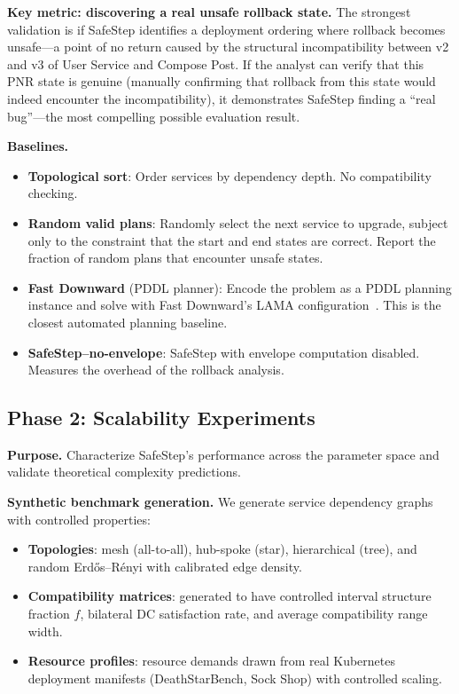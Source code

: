 \documentclass[10pt,twocolumn]{article}
\begin{document}
\textbf{Key metric: discovering a real unsafe rollback state.} The strongest validation is if SafeStep identifies a deployment ordering where rollback becomes unsafe---a point of no return caused by the structural incompatibility between v2 and v3 of User Service and Compose Post. If the analyst can verify that this PNR state is genuine (manually confirming that rollback from this state would indeed encounter the incompatibility), it demonstrates SafeStep finding a ``real bug''---the most compelling possible evaluation result.

\textbf{Baselines.}
\begin{itemize}
\item \textbf{Topological sort}: Order services by dependency depth. No compatibility checking.
\item \textbf{Random valid plans}: Randomly select the next service to upgrade, subject only to the constraint that the start and end states are correct. Report the fraction of random plans that encounter unsafe states.
\item \textbf{Fast Downward} (PDDL planner): Encode the problem as a PDDL planning instance and solve with Fast Downward's LAMA configuration~\cite{richter2010lama}. This is the closest automated planning baseline.
\item \textbf{SafeStep--no-envelope}: SafeStep with envelope computation disabled. Measures the overhead of the rollback analysis.
\end{itemize}

\subsection{Phase 2: Scalability Experiments}
\label{sec:eval-scalability}

\textbf{Purpose.} Characterize SafeStep's performance across the parameter space and validate theoretical complexity predictions.

\textbf{Synthetic benchmark generation.} We generate service dependency graphs with controlled properties:
\begin{itemize}
\item \textbf{Topologies}: mesh (all-to-all), hub-spoke (star), hierarchical (tree), and random Erd\H{o}s--R\'{e}nyi with calibrated edge density.
\item \textbf{Compatibility matrices}: generated to have controlled interval structure fraction $f$, bilateral DC satisfaction rate, and average compatibility range width.
\item \textbf{Resource profiles}: resource demands drawn from real Kubernetes deployment manifests (DeathStarBench, Sock Shop) with controlled scaling.
\end{itemize}
\end{document}
